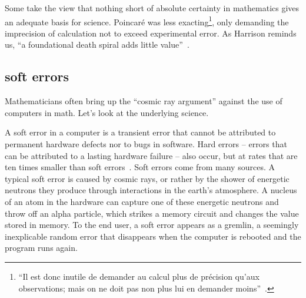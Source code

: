 \documentclass{llncs}
\begin{document}
Some take the view that nothing short of absolute certainty in
mathematics gives an adequate basis for science.  Poincar\'e was less
exacting\footnote{``Il est donc inutile de demander au calcul plus de
  pr\'ecision qu'aux observations; mais on ne doit pas non plus lui en
  demander moins''~\cite{HPMC}.},
only demanding the imprecision of calculation not to exceed
 experimental error.  As Harrison reminds us, 
``a foundational death spiral adds little value''~\cite{harrison-pm}.





\subsection{soft errors}\label{sec:soft}

Mathematicians often bring up the ``cosmic ray argument'' against the
use of computers in math.  Let's look at the underlying science.

A soft error in a computer is a transient error that cannot be
attributed to permanent hardware defects nor to bugs in software.
Hard errors -- errors that can be attributed to a lasting hardware
failure -- also occur, but at rates that are ten times smaller than
soft errors~\cite{MW04}.
Soft errors come from many sources. A typical soft error is caused by
cosmic rays, or rather by the shower of energetic neutrons they
produce through interactions in the earth's atmosphere.  A nucleus of
an atom in the hardware can capture one of these energetic neutrons
and throw off an alpha particle, which strikes a memory circuit and
changes the value stored in memory.  To the end user, a soft error
appears as a gremlin, a seemingly inexplicable random error that
disappears when the computer is rebooted and the program runs again.
\end{document}
